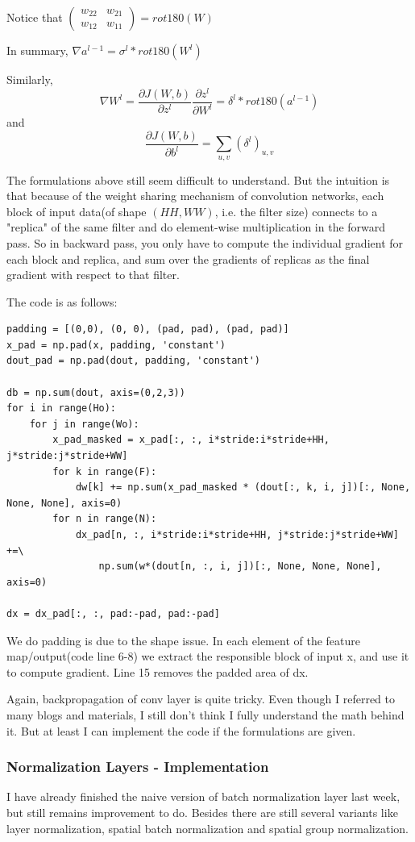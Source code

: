 \documentclass{article} %
\begin{document}
Notice that $\left( \begin{array}{ccc} 
w_{22}&w_{21}\\ 
w_{12}&w_{11} 
\end{array} \right)  = rot180(W)$

In summary, $\nabla a^{l-1}=\sigma^l * rot180(W^l)$

Similarly, 
$$\nabla W^{l} = \frac{\partial J(W,b)}{\partial z^{l}}\frac{\partial z^{l}}{\partial W^{l}} =\delta^l*rot180(a^{l-1})$$
and
$$\frac{\partial J(W,b)}{\partial b^{l}} = \sum\limits_{u,v}(\delta^l)_{u,v}$$

The formulations above still seem difficult to understand. But the intuition is that because of the weight sharing mechanism of convolution networks, each block of input data(of shape $(HH,WW)$, i.e. the filter size) connects to a "replica" of the same filter and do element-wise multiplication in the forward pass. So in backward pass, you only have to compute the individual gradient for each block and replica, and sum over the gradients of replicas as the final gradient with respect to that filter.

The code is as follows:
\begin{lstlisting}
padding = [(0,0), (0, 0), (pad, pad), (pad, pad)]
x_pad = np.pad(x, padding, 'constant')
dout_pad = np.pad(dout, padding, 'constant')

db = np.sum(dout, axis=(0,2,3))
for i in range(Ho):
	for j in range(Wo):
		x_pad_masked = x_pad[:, :, i*stride:i*stride+HH, j*stride:j*stride+WW]
		for k in range(F):
			dw[k] += np.sum(x_pad_masked * (dout[:, k, i, j])[:, None, None, None], axis=0)
		for n in range(N):
			dx_pad[n, :, i*stride:i*stride+HH, j*stride:j*stride+WW] +=\
				np.sum(w*(dout[n, :, i, j])[:, None, None, None], axis=0)

dx = dx_pad[:, :, pad:-pad, pad:-pad]
\end{lstlisting}
We do padding is due to the shape issue. In each element of the feature map/output(code line 6-8) we extract the responsible block of input x, and use it to compute gradient. Line 15 removes the padded area of dx.

Again, backpropagation of conv layer is quite tricky. Even though I referred to many blogs and materials, I still don't think I fully understand the math behind it. But at least I can implement the code if the formulations are given. 

\subsubsection{Normalization Layers - Implementation}
I have already finished the naive version of batch normalization layer last week, but still remains improvement to do. Besides there are still several variants like layer normalization, spatial batch normalization and spatial group normalization.
\end{document}
